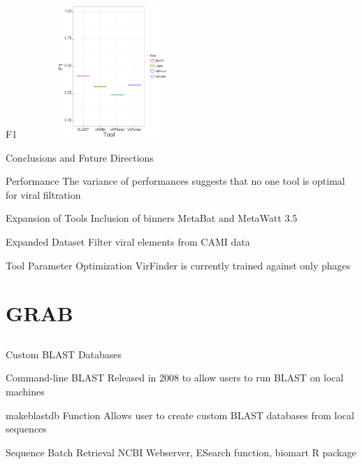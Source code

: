 \documentclass[11pt]{beamer}
\begin{document}
	\begin{frame}{F1}
	\vspace{-1cm}
	\center
	\includegraphics[height=5cm, width=7cm]{F1.png}
	\end{frame}
	
	\begin{frame}{Conclusions and Future Directions}
	
	\begin{block}{Performance}
	The variance of performances suggests that no one tool is optimal for viral filtration
	\end{block}
	
	\begin{block}{Expansion of Tools}
	Inclusion of binners MetaBat and MetaWatt 3.5
	\end{block}
	
	\begin{block}{Expanded Dataset}
	Filter viral elements from CAMI data
	\end{block}
	
	\begin{block}{Tool Parameter Optimization}
	VirFinder is currently trained against only phages 
	\end{block}
	
	\end{frame}
	

\section{GRAB}
\subsection{}

	\begin{frame}{Custom BLAST Databases}
	\begin{block}{Command-line BLAST}
	Released in 2008 to allow users to run BLAST on local machines
	\end{block}
	
	\begin{block}{makeblastdb Function}
	Allows user to create custom BLAST databases from local sequences
	\end{block}
	
	\begin{block}{Sequence Batch Retrieval}
	NCBI Webserver, ESearch function, biomart R package
	\end{block}
	
	\end{frame}
	
\end{document}
